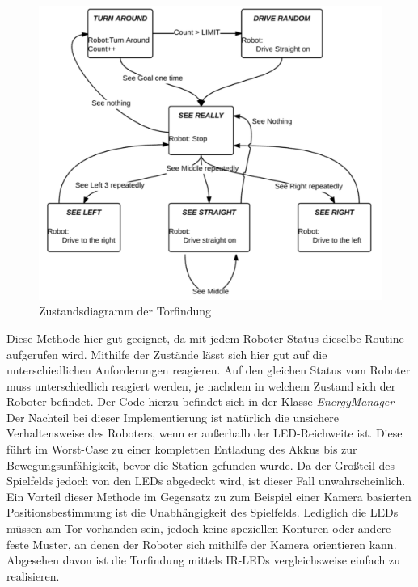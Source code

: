 \begin{figure}[!h]
	\includegraphics[width=\textwidth]{images/state_diagramm_findgoal.pdf}
	\caption{Zustandsdiagramm der Torfindung}
	\label{fig:state_findgoal}
\end{figure}

Diese Methode hier gut geeignet, da mit jedem Roboter Status dieselbe Routine aufgerufen wird. Mithilfe der Zustände lässt sich hier gut auf die unterschiedlichen Anforderungen reagieren. Auf den gleichen Status vom Roboter muss unterschiedlich reagiert werden, je nachdem in welchem Zustand sich der Roboter befindet. Der Code hierzu befindet sich in der Klasse \textit{EnergyManager} \cite{PROJEKT}\\
Der Nachteil bei dieser Implementierung ist natürlich die unsichere Verhaltensweise des Roboters, wenn er außerhalb der LED-Reichweite ist. Diese führt im Worst-Case zu einer kompletten Entladung des Akkus bis zur Bewegungsunfähigkeit, bevor die Station gefunden wurde. Da der Großteil des Spielfelds jedoch von den LEDs abgedeckt wird, ist dieser Fall unwahrscheinlich. Ein Vorteil dieser Methode im Gegensatz zu zum Beispiel einer Kamera basierten Positionsbestimmung ist die Unabhängigkeit des Spielfelds. Lediglich die LEDs müssen am Tor vorhanden sein, jedoch keine speziellen Konturen oder andere feste Muster, an denen der Roboter sich mithilfe der Kamera orientieren kann. Abgesehen davon ist die Torfindung mittels IR-LEDs vergleichsweise einfach zu realisieren.

